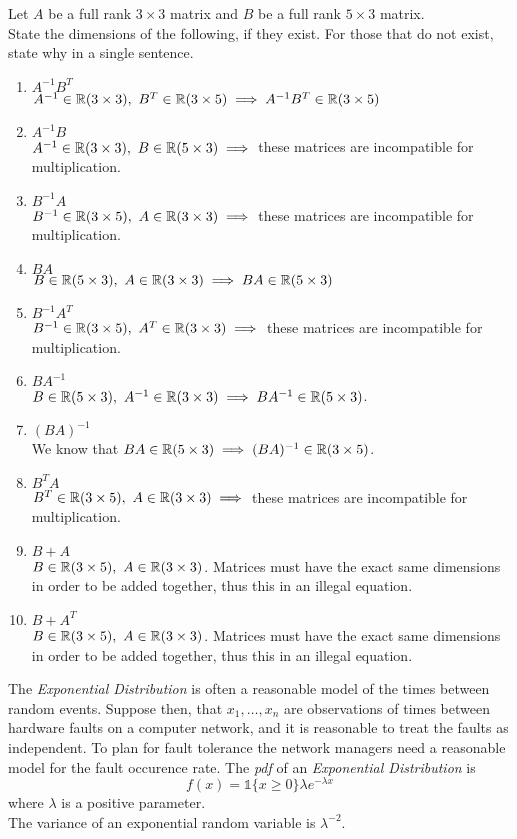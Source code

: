 \documentclass[11pt,a4paper]{article}
\begin{document}
\qpart
Let $A$ be a full rank $3\times 3$ matrix and $B$ be a full rank $5\times3$ matrix.\\
State the dimensions of the following, if they exist. For those that do not exist, state why in a single sentence.
\begin{enumerate}[label=\roman*)]
	\item $A^{-1}B^T$\\
	$A^{-1}\in\reals(3\times3),\ B^T\in\reals(3\times5)\implies A^{-1}B^T\in\reals(3\times5)$
	\item $A^{-1}B$\\
	$A^{-1}\in\reals(3\times3),\ B\in\reals(5\times3)\implies$ these matrices are incompatible for multiplication.
	\item $B^{-1}A$\\
	$B^{-1}\in\reals(3\times5),\ A\in\reals(3\times3)\implies$ these matrices are incompatible for multiplication.
	\item $BA$\\
	$B\in\reals(5\times3),\ A\in\reals(3\times3)\implies BA\in\reals(5\times3)$
	\item $B^{-1}A^T$\\
	$B^{-1}\in\reals(3\times5),\ A^T\in\reals(3\times3)\implies$ these matrices are incompatible for multiplication.
	\item $BA^{-1}$\\
	$B\in\reals(5\times3),\ A^{-1}\in\reals(3\times3)\implies BA^{-1}\in\reals(5\times3)$.
	\item $(BA)^{-1}$\\
	We know that $BA\in\mathbb{R}(5\times3)\implies(BA)^{-1}\in\mathbb{R}(3\times5)$.
	\item $B^TA$\\
	$B^T\in\reals(3\times5),\ A\in\reals(3\times3)\implies$ these matrices are incompatible for multiplication.
	\item $B+A$\\
	$B\in\reals(3\times5),\ A\in\reals(3\times3)$. Matrices must have the exact same dimensions in order to be added together, thus this in an illegal equation.
	\item $B+A^T$\\
	$B\in\reals(3\times5),\ A\in\reals(3\times3)$. Matrices must have the exact same dimensions in order to be added together, thus this in an illegal equation.
\end{enumerate}

\question
The \textit{Exponential Distribution} is often a reasonable model of the times between random events. Suppose then, that ${x_1,\dots,x_n}$ are observations of times between hardware faults on a computer network, and it is reasonable to treat the faults as independent. To plan for fault tolerance the network managers need a reasonable model for the fault occurence rate. The \textit{pdf} of an \textit{Exponential Distribution} is
$$f(x)=\mathds{1}\{x\geq0\}\lambda e^{-\lambda x}$$
where $\lambda$ is a positive parameter.\\
The variance of an exponential random variable is $\lambda^{-2}$.\\
\end{document}
